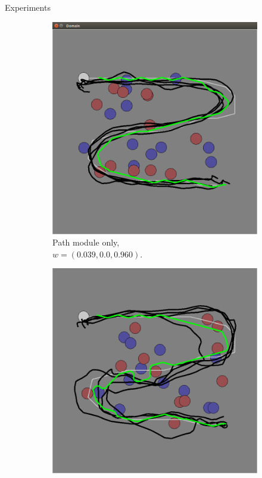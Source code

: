 \documentclass[final]{beamer}
\begin{document}
\begin{frame}{}
\begin{textblock}{69}
\begin{block}{Experiments}
\begin{figure}[h]
\centering
\begin{subfigure}[b]{0.47\textwidth}
\includegraphics[width=\textwidth]{task_1.png}
\caption{Path module only,\\$w = (0.039, 0.0, 0.960)$. }
\end{subfigure}
\begin{subfigure}[b]{0.47\textwidth}
\includegraphics[width=\textwidth]{task_2.png}

\end{subfigure}
\end{figure}
\end{block}
\end{textblock}
\end{frame}
\end{document}
